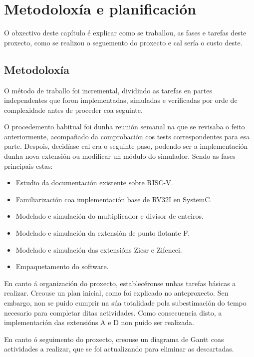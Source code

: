 \chapter{Metodoloxía e planificación}
\label{chap:metodoloxia_plan}


\lettrine{O}{} obxectivo deste capítulo é explicar como se traballou, as fases e tarefas deste proxecto, como se realizou o seguemento do proxecto e cal sería o custo deste.


\section{Metodoloxía}
\label{sec:metodoloxía}
O método de traballo foi incremental, dividindo as tarefas en partes independentes que foron implementadas, simuladas e verificadas por orde de complexidade antes de proceder coa seguinte.

O procedemento habitual foi dunha reunión semanal na que se revisaba o feito anteriormente, acompañado da comprobación cos tests correspondentes para esa parte. Despois, decidíase cal era o seguinte paso, podendo ser a implementación dunha nova extensión ou modificar un módulo do simulador. Sendo as fases principais estas:

\begin{itemize}
    \item Estudio da documentación existente sobre RISC-V.
    \item Familiarización coa implementación base de RV32I en SystemC. 
    \item Modelado e simulación do multiplicador e divisor de enteiros. 
    \item Modelado e simulación da extensión de punto flotante F. 
    \item Modelado e simulación das extensións Zicsr e  Zifencei.
    \item Empaquetamento do software. 

\end{itemize}

En canto á organización do proxecto, establecéronse unhas tarefas básicas a realizar. Creouse un plan inicial, como foi explicado no anteproxecto. Sen embargo, non se puido cumprir na súa totalidade pola subestimación do tempo necesario para completar ditas actividades. Como consecuencia disto, a implementación das extensións A e D non puido ser realizada. 

En canto ó seguimento do proxecto, creouse un diagrama de Gantt coas actividades a realizar, que se foi actualizando para eliminar as descartadas. 


